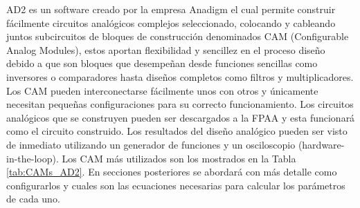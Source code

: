 	AD2 es un software creado por la empresa Anadigm el cual permite construir fácilmente circuitos analógicos complejos seleccionado, colocando y cableando juntos subcircuitos de bloques de construcción  denominados CAM (Configurable Analog Modules), estos aportan flexibilidad y sencillez en el proceso diseño debido a que son bloques que desempeñan desde funciones sencillas como inversores o comparadores hasta diseños completos como filtros y multiplicadores. Los CAM pueden interconectarse fácilmente unos con otros y únicamente necesitan pequeñas configuraciones para su correcto funcionamiento. Los circuitos analógicos que se construyen pueden ser descargados a la FPAA y esta funcionará como el circuito construido. Los resultados del diseño analógico pueden ser visto de inmediato utilizando un generador de funciones y un osciloscopio (hardware-in-the-loop). Los CAM más utilizados son los mostrados en la Tabla \ref{tab:CAMs_AD2}. En secciones posteriores se abordará con más detalle como configurarlos y cuales son las ecuaciones necesarias para calcular los parámetros de cada uno.  
	

